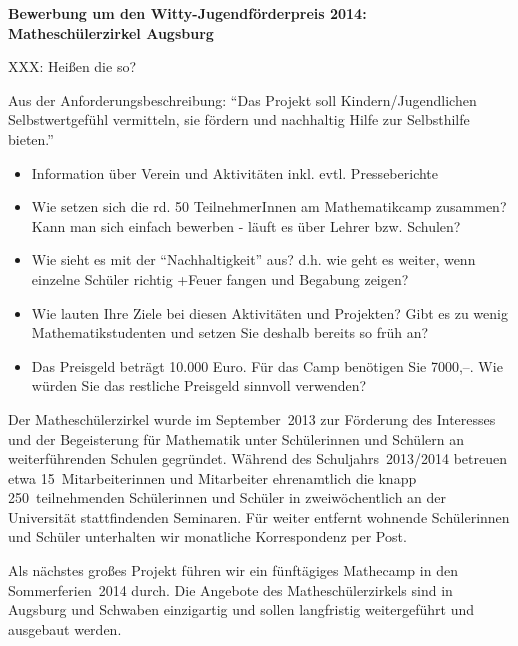 \documentclass[12pt]{zettel}
\begin{document}
\pagestyle{plain}

\renewcommand{\betreff}{}

\makeletterhead{}

\vspace{-2em}

\begin{center}
  \Large\textbf{\textsf{Bewerbung um den Witty-Jugendförderpreis 2014: \\
  Matheschülerzirkel Augsburg}}
\end{center}

XXX: Heißen die so?

Aus der Anforderungsbeschreibung: "`Das Projekt soll
Kindern/Jugendlichen Selbstwertgefühl vermitteln, sie fördern und nachhaltig
Hilfe zur Selbsthilfe bieten."'

\begin{itemize}
\item Information über Verein und Aktivitäten inkl. evtl. Presseberichte
\item Wie setzen sich die rd. 50 TeilnehmerInnen am Mathematikcamp zusammen? Kann
man sich einfach bewerben - läuft es über Lehrer bzw. Schulen?
\item Wie sieht es mit der "`Nachhaltigkeit"' aus? d.h. wie geht es weiter, wenn
einzelne Schüler richtig +Feuer fangen und Begabung zeigen?
\item Wie lauten Ihre Ziele bei diesen Aktivitäten und Projekten? Gibt es zu
wenig Mathematikstudenten und setzen Sie deshalb bereits so früh an?
\item Das Preisgeld beträgt 10.000 Euro. Für das Camp benötigen Sie 7000,--. Wie
würden Sie das restliche Preisgeld sinnvoll verwenden?
\end{itemize}

Der Matheschülerzirkel wurde im September~2013 zur Förderung des
Interesses und der Begeisterung für Mathematik unter Schülerinnen und Schülern
an weiterführenden Schulen gegründet. Während des Schuljahrs~2013/2014 betreuen
etwa 15~Mitarbeiterinnen und Mitarbeiter ehrenamtlich die knapp
250~teilnehmenden Schülerinnen und Schüler in zweiwöchentlich an der
Universität stattfindenden Seminaren. Für weiter entfernt wohnende Schülerinnen
und Schüler unterhalten wir monatliche Korrespondenz per Post.

Als nächstes großes Projekt führen wir ein fünftägiges Mathecamp in den
Sommerferien~2014 durch. Die Angebote des Matheschülerzirkels sind in Augsburg
und Schwaben einzigartig und sollen langfristig weitergeführt und ausgebaut
werden.
\end{document}
